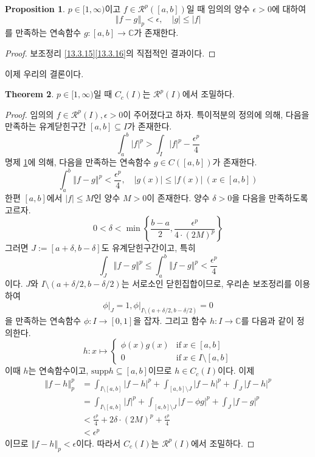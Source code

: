 \documentclass[11pt]{book}
\numberwithin{equation}{chapter}
\def\CC{\mathbb{C}}
\def\eps{\epsilon}
\def\calR{\mathcal{R}}
\newcommand{\abs}[1]{\left\vert#1\right\vert}
\newcommand{\norm}[1]{\left\Vert#1\right\Vert}
\def\textif{\text{if}}
\theoremstyle{definition}
\newtheorem{thm}{Theorem}[section]
\newtheorem{prop}[thm]{Proposition}
\begin{document}
\begin{prop} \label{13.3.17}
    \(p \in [1, \infty)\)이고 \(f \in \calR^p([a, b])\)일 때 임의의 양수 \(\eps > 0\)에 대하여
    \[
        \norm{f - g}_p < \eps, \quad \abs{g} \le \abs{f}
    \]
    를 만족하는 연속함수 \(g : [a, b] \to \CC\)가 존재한다.
\end{prop}
\begin{proof}
    보조정리 \ref{13.3.15}\와 \ref{13.3.16}의 직접적인 결과이다.
\end{proof}

이제 우리의 결론이다.

\begin{thm}
    \(p \in [1, \infty)\)일 때 \(C_c(I)\)는 \(\calR^p(I)\)에서 조밀하다.
\end{thm}
\begin{proof}
    임의의 \(f \in \calR^p(I), \eps > 0\)이 주어졌다고 하자. 특이적분의 정의에 의해, 다음을 만족하는 유계닫힌구간 \([a, b] \subseteq I\)가 존재한다.
    \[
    \int_a^b \abs{f}^p > \int_I \abs{f}^p - \frac{\eps^p}{4}
    \]
    명제 \ref{13.3.17}에 의해, 다음을 만족하는 연속함수 \(g \in C([a, b])\)가 존재한다.
    \[
    \int_a^b \norm{f - g}^p < \frac{\eps^p}{4}, \quad \abs{g(x)} \le \abs{f(x)} \ (x \in [a, b])
    \]
    한편 \([a, b]\)에서 \(\abs{f} \le M\)인 양수 \(M > 0\)이 존재한다. 양수 \(\delta > 0\)을 다음을 만족하도록 고르자.
    \[
    0 < \delta < \min \left\{\frac{b -a }{2}, \frac{\eps^p}{4 \cdot (2M)^p}\right\}    
    \]
    그러면 \(J := [a + \delta, b - \delta]\)도 유계닫힌구간이고, 특히
    \[
    \int_J \norm{f - g}^p \le \int_a^b \norm{f - g}^p < \frac{\eps^p}{4}    
    \]
    이다. \(J\)와 \(I \setminus (a + \delta/2, b - \delta/2)\)는 서로소인 닫힌집합이므로, 우리손 보조정리를 이용하여
    \[
        \phi \vert_J = 1, \phi \vert_{I \setminus (a + \delta/2, b - \delta/2)} = 0
    \]
    을 만족하는 연속함수 \(\phi : I \to [0, 1]\)을 잡자. 그리고 함수 \(h : I \to \CC\)를 다음과 같이 정의한다.
    \[
    h : x \mapsto
    \begin{cases}
        \phi(x)g(x) &\textif \ x \in [a, b]\\
        0 &\textif \ x \in I \setminus [a, b]
    \end{cases}    
    \]
    이때 \(h\)는 연속함수이고, \(\mathrm{supp}h \subseteq [a, b]\)이므로 \(h \in C_c(I)\)이다. 이제
    \begin{align*}
        \norm{f - h}_p^p &= \int_{I \setminus [a, b]} \abs{f - h}^p + \int_{[a, b] \setminus J} \abs{f - h}^p + \int_J \abs{f - h}^p\\
        &= \int_{I \setminus [a, b]} \abs{f}^p + \int_{[a, b] \setminus J} \abs{f - \phi g}^p + \int_J \abs{f - g}^p\\
        &< \frac{\eps^p}{4} + 2\delta \cdot (2M)^p + \frac{\eps^p}{4}\\
        &< \eps^p
    \end{align*}
    이므로 \(\norm{f - h}_p < \eps\)이다. 따라서 \(C_c(I)\)는 \(\calR^p(I)\)에서 조밀하다.
\end{proof}
\end{document}
